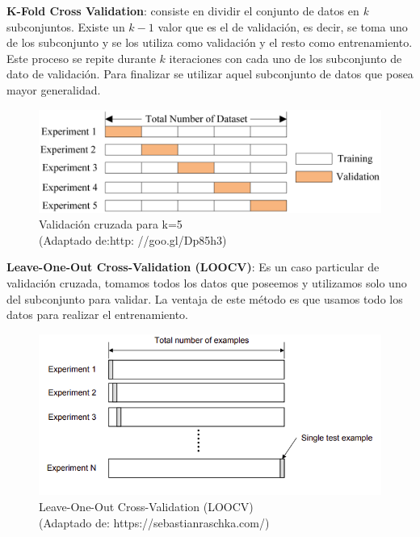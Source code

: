\par \textbf{K-Fold Cross Validation}: consiste en dividir el conjunto de datos en \textit{k} subconjuntos. Existe un $k-1 $ valor que es el de validación, es decir, se toma uno de los subconjunto y se los utiliza como validación y el resto como entrenamiento.  Este proceso se repite durante $k $ iteraciones con cada uno de los subconjunto de dato de validación. Para finalizar se utilizar aquel subconjunto de datos que posea mayor generalidad.
\begin{figure}[H]
 \centering
  \includegraphics[scale=0.4,keepaspectratio=true,clip=true]{imagenes/MarcoTeorico/crossvalidat.png}
  \caption{Validación cruzada para k=5\\(Adaptado de:{http: //goo.gl/Dp85h3})}
	\label{Fig: crossvalidation}
\end{figure}

\par \textbf{Leave-One-Out Cross-Validation (LOOCV)}: Es un caso particular de validación cruzada, tomamos todos los datos que poseemos y utilizamos solo uno del subconjunto para validar. La ventaja de este método es que usamos todo los datos para realizar el entrenamiento.

\begin{figure}[H]
 \centering
  \includegraphics[scale=0.4,keepaspectratio=true,clip=true]{imagenes/MarcoTeorico/cross-validation-LOOCV.png}
  \caption{Leave-One-Out Cross-Validation (LOOCV) \\ (Adaptado de: https://sebastianraschka.com/)}
	\label{Fig: crossvalidation-LOOCV}
\end{figure}

